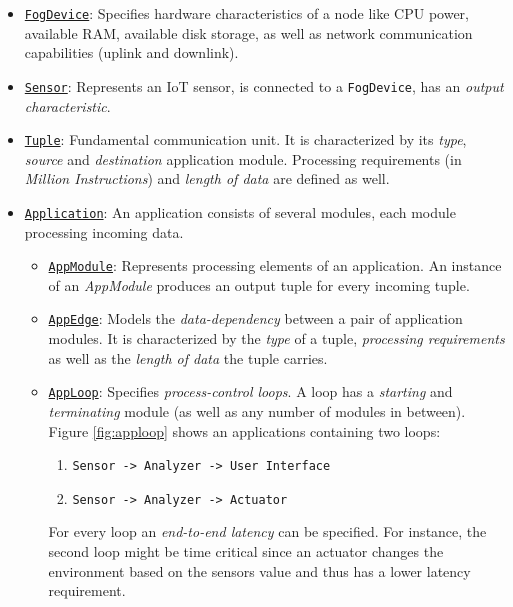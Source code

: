 \begin{itemize}
    \item \underline{\texttt{FogDevice}}: Specifies hardware characteristics of a node like CPU power, available RAM, available disk storage, as well as network communication capabilities (uplink and downlink).
    
    \item \underline{\texttt{Sensor}}: Represents an IoT sensor, is connected to a \texttt{FogDevice}, has an \textit{output characteristic}.
    
    \item \underline{\texttt{Tuple}}: Fundamental communication unit. It is characterized by its \textit{type}, \textit{source} and \textit{destination} application module. Processing requirements (in \textit{Million Instructions}) and \textit{length of data} are defined as well. 
    
    \item \underline{\texttt{Application}}: An application consists of several modules, each module processing incoming data.
    \begin{itemize}
        \item \underline{\texttt{AppModule}}: Represents processing elements of an application. An instance of an \textit{AppModule} produces an output tuple for every incoming tuple.
        
        \item \underline{\texttt{AppEdge}}: Models the \textit{data-dependency} between a pair of application modules. It is characterized by the \textit{type} of a tuple, \textit{processing requirements} as well as the \textit{length of data} the tuple carries.
        
        \item \underline{\texttt{AppLoop}}: Specifies \textit{process-control loops}. A loop has a \textit{starting} and \textit{terminating} module (as well as any number of modules in between). Figure \ref{fig:apploop} shows an applications containing two loops: \begin{enumerate}
            \item \texttt{Sensor -> Analyzer -> User Interface}
            \item \texttt{Sensor -> Analyzer -> Actuator}
        \end{enumerate}
        For every loop an \textit{end-to-end latency} can be specified. For instance, the second loop might be time critical since an actuator changes the environment based on the sensors value and thus has a lower latency requirement.
    \end{itemize}
\end{itemize}

